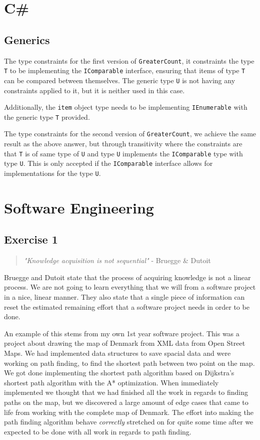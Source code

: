 \documentclass[12pt,letterpaper]{article}
\begin{document}
\section{C\#}
\subsection{Generics}
The type constraints for the first version of \lstinline{GreaterCount}, it constraints the type
\lstinline{T} to be implementing the \lstinline{IComparable} interface, ensuring that items of type \lstinline{T}
can be compared between themselves. The generic type \lstinline{U} is not having any constraints applied to it,
but it is neither used in this case. 

Additionally, the \lstinline{item} object type needs to be implementing \lstinline{IEnumerable} with the 
generic type \lstinline{T} provided.

The type constraints for the second version of \lstinline{GreaterCount}, we achieve the same result as the above answer,
but through transitivity where the constraints are that \lstinline{T} is of same type of \lstinline{U} and type \lstinline{U} 
implements the \lstinline{IComparable} type with type \lstinline{U}. This is only accepted if the \lstinline{IComparable} interface
allows for implementations for the type \lstinline{U}.

\section{Software Engineering}
\subsection{Exercise 1}

\begin{quote}
  \textit{"Knowledge acquisition is not sequential"} - Bruegge \& Dutoit  
\end{quote}

Bruegge and Dutoit state that the process of acquiring knowledge is not a linear process.
We are not going to learn everything that we will from a software project in a nice, linear manner.
They also state that a single piece of information can reset the estimated remaining effort
that a software project needs in order to be done.

An example of this stems from my own 1st year software project. This was a project about
drawing the map of Denmark from XML data from Open Street Maps. We had implemented data structures
to save spacial data and were working on path finding, to find the shortest path between two
point on the map. We got done implementing the shortest path algorithm based on 
Dijkstra's shortest path algorithm with the A* optimization. When immediately implemented 
we thought that we had finished all the work in regards to finding paths on the map, but we
discovered a large amount of edge cases that came to life from working with the complete
map of Denmark. The effort into making the path finding algorithm behave \textit{correctly}
stretched on for quite some time after we expected to be done with all work in regards to path finding.
\end{document}
